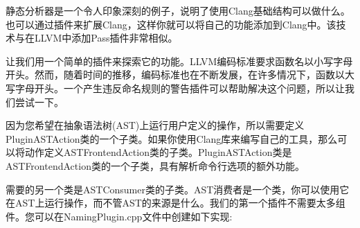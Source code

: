 静态分析器是一个令人印象深刻的例子，说明了使用Clang基础结构可以做什么。也可以通过插件来扩展Clang，这样你就可以将自己的功能添加到Clang中。该技术与在LLVM中添加Pass插件非常相似。\par

让我们用一个简单的插件来探索它的功能。LLVM编码标准要求函数名以小写字母开头。然而，随着时间的推移，编码标准也在不断发展，在许多情况下，函数以大写字母开头。一个产生违反命名规则的警告插件可以帮助解决这个问题，所以让我们尝试一下。\par

因为您希望在抽象语法树(AST)上运行用户定义的操作，所以需要定义PluginASTAction类的一个子类。如果你使用Clang库来编写自己的工具，那么可以将动作定义ASTFrontendAction类的子类。PluginASTAction类是ASTFrontendAction类的一个子类，具有解析命令行选项的额外功能。\par

需要的另一个类是ASTConsumer类的子类。AST消费者是一个类，你可以使用它在AST上运行操作，而不管AST的来源是什么。我们的第一个插件不需要太多组件。您可以在NamingPlugin.cpp文件中创建如下实现:\par

